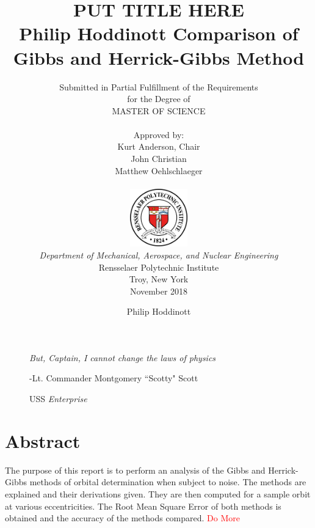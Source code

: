 \documentclass[12pt]{article}
\title{ 
		\LARGE \textbf{\uppercase{Put Title Here}} \\
		\vspace{0.25cm}
		\LARGE \textbf{Philip Hoddinott}
	}
\author{\small{Submitted in Partial Fulfillment of the Requirements} \\ \small{for the Degree of} \\
		\uppercase{Master of Science} \\ \\
		Approved by:
		\\ Kurt Anderson, Chair \\ John Christian \\ Matthew Oehlschlaeger \\ \\ %
		\includegraphics[width=2.5cm]{rensselaer_seal.png} \\
		\small{\textit{Department of Mechanical, Aerospace, and Nuclear Engineering}} \\
		\small{Rensselaer Polytechnic Institute} \\ 
		\small{Troy, New York} \\
		\small{November 2018}
	}
\newlength\longest
\begin{document}
		\title{Comparison of Gibbs and Herrick-Gibbs Method}
	\author{Philip Hoddinott}
	
	\maketitle
	\thispagestyle{empty}
	\clearpage
	
	\thispagestyle{empty}
	\null\vfill
	
	\begin{figure}[!t]
		\begin{center}
			\settowidth{}
			\parbox{\longest}{%
				\raggedright{\huge\itshape%
					But, Captain, I cannot change the laws of physics\par\bigskip
				}   
				\raggedleft\Large{-Lt. Commander Montgomery ``Scotty" Scott}\par
				\raggedleft\Large{USS}\textit{ Enterprise}\par%
				
			}
		\end{center}
	\end{figure}
	
	
	\null\vfill
	
	\newpage
	\tableofcontents
	
	\newpage


	
	\listoftables
	\listoffigures
	
	\newpage
		\doublespacing

	
	
	\newpage
	\section{Abstract}
	The purpose of this report is to perform an analysis of the Gibbs and Herrick-Gibbs methods of orbital determination when subject to noise. The methods are explained and their derivations given. They are then computed for a sample orbit at various eccentricities. The Root Mean Square Error of both methods is obtained and the accuracy of the methods compared. 
	\textcolor{red}{ Do More}
	\newpage
\end{document}
